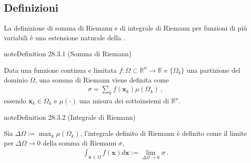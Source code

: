 \documentclass[letterpaper,10pt,italian]{jupyterBook}
\begin{document}
\subsection{Definizioni}
\label{\detokenize{ch/multivariable-calculus/integrals:definizioni}}\label{\detokenize{ch/multivariable-calculus/integrals:multivariable-calculus-integrals-def}}
\sphinxAtStartPar
La definizione di somma di Riemann e di integrale di Riemann per funzioni di più variabili è una estensione naturale della {\hyperref[\detokenize{ch/infinitesimal_calculus/integrals:infinitesimal-calculus-integrals-def}]{}}.
\label{ch/multivariable-calculus/integrals:multivariable-calculus:integrals:def:riemann-sum}
\begin{sphinxadmonition}{note}{Definition 28.3.1 (Somma di Riemann)}



\sphinxAtStartPar
Data una funzione continua e limitata \(f: \Omega \subset \mathbb{R}^n \rightarrow \mathbb{R}\) e \(\{ \Omega_k \}\) una partizione del dominio \(\Omega\), una somma di Riemann viene definita come
\begin{equation*}
\begin{split}\sigma = \sum_{k} f(\mathbf{x}_k) \mu(\Omega_k) \ ,\end{split}
\end{equation*}
\sphinxAtStartPar
essendo \(\mathbf{x}_k \in \Omega_k\) e \(\mu(\cdot)\) una misura dei sottoinsiemi di \(\mathbb{R}^n\).
\end{sphinxadmonition}
\label{ch/multivariable-calculus/integrals:multivariable-calculus:integrals:def:riemann-integral}
\begin{sphinxadmonition}{note}{Definition 28.3.2 (Integrale di Riemann)}



\sphinxAtStartPar
Sia \(\Delta \Omega := \max_k \mu(\Omega_k)\), l’integrale definito di Riemann è definito come il limite per \(\Delta \Omega \rightarrow 0\) della somma di Riemann \(\sigma\),
\begin{equation*}
\begin{split}\int_{\mathbf{x} \in \Omega} f(\mathbf{x}) d \mathbf{x} := \lim_{\Delta \Omega \rightarrow 0} \sigma \ .\end{split}
\end{equation*}\end{sphinxadmonition}

\sphinxAtStartPar
{} 
\end{document}

